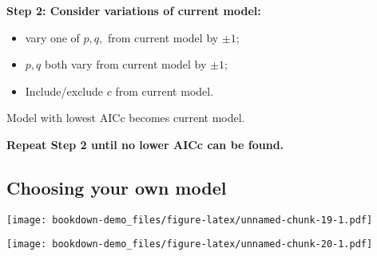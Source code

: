 \documentclass[]{book}
\newenvironment{Shaded}{\begin{snugshade}}{\end{snugshade}}
\newcommand{\DataTypeTok}[1]{\textcolor[rgb]{0.13,0.29,0.53}{#1}}
\newcommand{\DecValTok}[1]{\textcolor[rgb]{0.00,0.00,0.81}{#1}}
\newcommand{\KeywordTok}[1]{\textcolor[rgb]{0.13,0.29,0.53}{\textbf{#1}}}
\newcommand{\NormalTok}[1]{#1}
\newcommand{\OperatorTok}[1]{\textcolor[rgb]{0.81,0.36,0.00}{\textbf{#1}}}
\newcommand{\StringTok}[1]{\textcolor[rgb]{0.31,0.60,0.02}{#1}}
\providecommand{\tightlist}{%
  \setlength{\itemsep}{0pt}\setlength{\parskip}{0pt}}
\begin{document}
\textbf{Step 2: Consider variations of current model:}

\begin{itemize}
\tightlist
\item
  vary one of \(p,q,\) from current model by \(\pm1\);
\item
  \(p,q\) both vary from current model by \(\pm1\);
\item
  Include/exclude \(c\) from current model.
\end{itemize}

Model with lowest AICc becomes current model.

\textbf{Repeat Step 2 until no lower AICc can be found.}

\hypertarget{choosing-your-own-model}{%
\subsection{Choosing your own model}\label{choosing-your-own-model}}

\begin{Shaded}
\end{Shaded}

\texttt{[image: bookdown-demo\_files/figure-latex/unnamed-chunk-19-1.pdf]}

\begin{Shaded}
\end{Shaded}

\texttt{[image: bookdown-demo\_files/figure-latex/unnamed-chunk-20-1.pdf]}

\begin{Shaded}
\end{Shaded}
\end{document}
